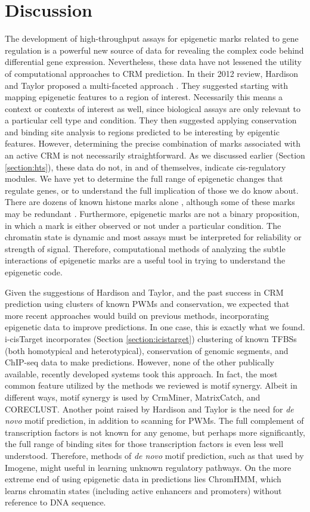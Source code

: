 \documentclass{frontiersENG} %
\begin{document}
\section{Discussion}
The development of high-throughput assays for epigenetic marks related
to gene regulation is a powerful new source of data for revealing the
complex code behind differential gene expression. Nevertheless, these
data have not lessened the utility of computational approaches to CRM
prediction. In their 2012 review, Hardison and Taylor proposed a
multi-faceted approach \cite{Hardison2012}. They suggested starting
with mapping epigenetic features to a region of interest. Necessarily
this means a context or contexts of interest as well, since biological
assays are only relevant to a particular cell type and condition. They
then suggested applying conservation and binding site analysis to
regions predicted to be interesting by epigentic features. However,
determining the precise combination of marks associated with an active
CRM is not necessarily straightforward. As we discussed earlier
(Section \ref{section:hts}), these data do not, in and of themselves,
indicate cis-regulatory modules. We have yet to determine the full
range of epigenetic changes that regulate genes, or to understand the
full implication of those we do know about. There are dozens of known
histone marks alone \cite{Tan2011}, although some of these marks may
be redundant \cite{Zentner2013}. Furthermore, epigenetic marks are not
a binary proposition, in which a mark is either observed or not under
a particular condition. The chromatin state is dynamic and most assays
must be interpreted for reliability or strength of signal. Therefore,
computational methods of analyzing the subtle interactions of
epigenetic marks are a useful tool in trying to understand the
epigenetic code.

Given the suggestions of Hardison and Taylor, and the past success in
CRM prediction using clusters of known PWMs and conservation, we
expected that more recent approaches would build on previous methods,
incorporating epigenetic data to improve predictions. In one case,
this is exactly what we found. i-cisTarget incorporates (Section
\ref{section:icistarget}) clustering of known TFBSs (both homotypical
and heterotypical), conservation of genomic segments, and ChIP-seq
data to make predictions. However, none of the other publically
available, recently developed systems took this approach. In fact, the
most common feature utilized by the methods we reviewed is motif
synergy. Albeit in different ways, motif synergy is used by CrmMiner,
MatrixCatch, and CORECLUST. Another point raised by Hardison and
Taylor is the need for \textit{de novo} motif prediction, in addition
to scanning for PWMs. The full complement of transcription factors is
not known for any genome, but perhaps more significantly, the full
range of binding sites for those transcription factors is even less
well understood. Therefore, methods of \textit{de novo} motif
prediction, such as that used by Imogene, might useful in learning
unknown regulatory pathways. On the more extreme end of using
epigenetic data in predictions lies ChromHMM, which learns chromatin
states (including active enhancers and promoters) without reference to
DNA sequence.
\end{document}
